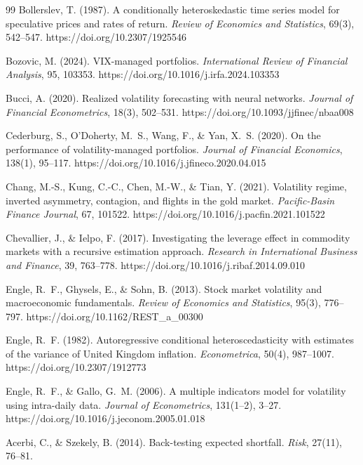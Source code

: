 \documentclass[12pt,a4paper]{article}
\begin{document}
\begin{thebibliography}{99}
Bollerslev, T. (1987). A conditionally heteroskedastic time series model for speculative prices and rates of return. \textit{Review of Economics and Statistics}, 69(3), 542--547. https://doi.org/10.2307/1925546

Bozovic, M. (2024). VIX-managed portfolios. \textit{International Review of Financial Analysis}, 95, 103353. https://doi.org/10.1016/j.irfa.2024.103353

Bucci, A. (2020). Realized volatility forecasting with neural networks. \textit{Journal of Financial Econometrics}, 18(3), 502--531. https://doi.org/10.1093/jjfinec/nbaa008

Cederburg, S., O'Doherty, M.~S., Wang, F., \& Yan, X.~S. (2020). On the performance of volatility-managed portfolios. \textit{Journal of Financial Economics}, 138(1), 95--117. https://doi.org/10.1016/j.jfineco.2020.04.015

Chang, M.-S., Kung, C.-C., Chen, M.-W., \& Tian, Y. (2021). Volatility regime, inverted asymmetry, contagion, and flights in the gold market. \textit{Pacific-Basin Finance Journal}, 67, 101522. https://doi.org/10.1016/j.pacfin.2021.101522

Chevallier, J., \& Ielpo, F. (2017). Investigating the leverage effect in commodity markets with a recursive estimation approach. \textit{Research in International Business and Finance}, 39, 763--778. https://doi.org/10.1016/j.ribaf.2014.09.010

Engle, R.~F., Ghysels, E., \& Sohn, B. (2013). Stock market volatility and macroeconomic fundamentals. \textit{Review of Economics and Statistics}, 95(3), 776--797. https://doi.org/10.1162/REST\_a\_00300

Engle, R.~F. (1982). Autoregressive conditional heteroscedasticity with estimates of the variance of United Kingdom inflation. \textit{Econometrica}, 50(4), 987--1007. https://doi.org/10.2307/1912773

Engle, R.~F., \& Gallo, G.~M. (2006). A multiple indicators model for volatility using intra-daily data. \textit{Journal of Econometrics}, 131(1--2), 3--27. https://doi.org/10.1016/j.jeconom.2005.01.018

Acerbi, C., \& Szekely, B. (2014). Back-testing expected shortfall. \textit{Risk}, 27(11), 76--81.


\end{thebibliography}
\end{document}

